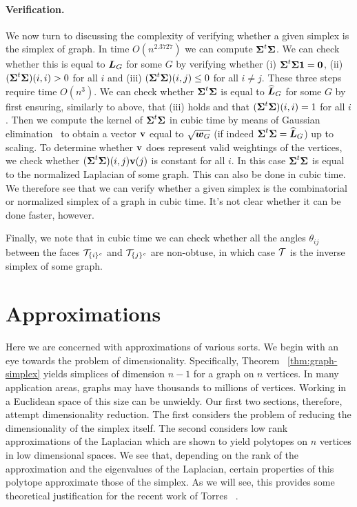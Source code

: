 \paragraph{Verification.}
We  now turn  to discussing the complexity of  verifying whether  a given simplex is the simplex of graph. 
In time $O(n^{2.3727})$ we can compute $\boldsymbol{\Sigma}^t\boldsymbol{\Sigma}$. We can check whether this is equal to $\vb*{L}_G$ for some $G$ by verifying whether (i) $\boldsymbol{\Sigma}^t\boldsymbol{\Sigma}\vb{1}=\vb{0}$, (ii) $(\boldsymbol{\Sigma}^t\boldsymbol{\Sigma})(i,i)>0$ for all $i$ and (iii) $(\boldsymbol{\Sigma}^t\boldsymbol{\Sigma})(i,j)\leq 0$ for all $i\neq j$. These three steps require time $O(n^3)$. We can check whether $\boldsymbol{\Sigma}^t\boldsymbol{\Sigma}$ is equal to $\widehat{\vb*{L}}_G$ for some $G$ by first ensuring, similarly to above, that (iii) holds and that $(\boldsymbol{\Sigma}^t\boldsymbol{\Sigma})(i,i)=1$ for all $i$. Then we compute the kernel  of $\boldsymbol{\Sigma}^t\boldsymbol{\Sigma}$ in cubic time by means of Gaussian elimination~\cite{kailath1999fast} to obtain a vector $\vb{v}$ equal to $\sqrt{\vb*{w}_G}$ (if indeed $\boldsymbol{\Sigma}^t\boldsymbol{\Sigma}=\widehat{\vb*{L}}_G$) up to scaling. To determine whether $\vb{v}$ does represent valid weightings of the vertices, we check whether $(\boldsymbol{\Sigma}^t\boldsymbol{\Sigma})(i,j)\vb{v}(j)$ is constant for all $i$. In  this case $\boldsymbol{\Sigma}^t\boldsymbol{\Sigma}$ is equal to the normalized Laplacian of some graph. This can also be done in cubic time. We  therefore see that we can  verify whether a given simplex is the combinatorial or  normalized simplex of a graph in  cubic time. It's not clear whether it can be done faster, however. 

Finally, we note that in cubic time we can check whether all the angles $\theta_{ij}$ between the faces $\mathcal{T}_{\{i\}^c}$ and $\mathcal{T}_{\{j\}^c}$ are non-obtuse, in which case $\mathcal{T}$ is the inverse simplex of some graph. 


\section{Approximations} 
\label{sec:algorithmics_approximations}
Here we are concerned  with  approximations of various sorts. We begin  with an eye towards the problem of  dimensionality. Specifically, Theorem ~\ref{thm:graph-simplex} yields simplices of dimension $n-1$ for a graph on $n$ vertices. In  many application areas, graphs may have thousands  to  millions of vertices. Working in a Euclidean space  of  this  size can be unwieldy. Our first two  sections,  therefore, attempt dimensionality reduction. The first  considers the problem of reducing the dimensionality of the simplex itself. The second considers low rank approximations of  the Laplacian which are  shown to yield polytopes on  $n$ vertices in  low  dimensional spaces. We see that, depending on the rank of the  approximation and the eigenvalues of the Laplacian, certain properties of this polytope approximate  those of the simplex. As we will see, this provides some  theoretical justification for  the  recent work of Torres \etal~\cite{torres2019geometric}. 

